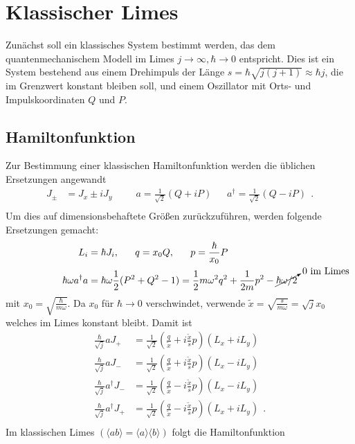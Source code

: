 \section{Klassischer Limes}
Zunächst soll ein klassisches System bestimmt werden, das dem quantenmechanischem Modell im Limes $j\rightarrow \infty, \hbar \rightarrow 0$ entspricht.
Dies ist ein System bestehend aus einem Drehimpuls der Länge $s = \hbar\sqrt{j(j+1)} \approx \hbar j$, die im Grenzwert konstant bleiben soll, und einem Oszillator mit Orts- und Impulskoordinaten $Q$ und $P$.
\subsection{Hamiltonfunktion}
Zur Bestimmung einer klassischen Hamiltonfunktion werden die üblichen Ersetzungen angewandt
\begin{align*}
  J_{\pm} &= J_x \pm i J_y~~~~~~~~~~~ a = \frac{1}{\sqrt{2}} (Q+iP)~~~~~~~ a^\dagger = \frac{1}{\sqrt{2}} (Q-iP)~~.\\
\end{align*}
Um dies auf dimensionsbehaftete Größen zurückzuführen, werden folgende Ersetzungen gemacht:
\begin{align*}
  L_i &= \hbar J_i,~~~~~  q=x_0 Q,~~~~~p= \frac{\hbar}{x_0} P\\
  \hbar \omega a^\dagger a &=\hbar \omega \frac{1}{2} (P^2+Q^2-1) = \frac{1}{2} m \omega^2 q^2 + \frac{1}{2m}p^2 -\cancelto{\text{0 im Limes}}{\hbar\omega/2}\\
\end{align*}
mit $x_0  =  \sqrt{\frac{\hbar}{m\omega}}$.
 Da $x_0$ für $\hbar\rightarrow 0$ verschwindet, verwende \linebreak  $\tilde{x} = \sqrt{\frac{s}{m\omega}} = \sqrt{j} x_0$ welches im Limes konstant bleibt.
Damit ist
\begin{align*}
  \frac{\hbar}{\sqrt{j}} a J_+ &= \frac{1}{\sqrt{2}}(\frac{q}{\tilde{x}} + i \frac{\tilde{x}}{s} p) (L_x + i L_y)\\
  \frac{\hbar}{\sqrt{j}} a J_- &=\frac{1}{\sqrt{2}}(\frac{q}{\tilde{x}} + i \frac{\tilde{x}}{s} p)(L_x - i L_y)\\
  \frac{\hbar}{\sqrt{j}} a^\dagger J_- &=\frac{1}{\sqrt{2}}(\frac{q}{\tilde{x}} - i \frac{\tilde{x}}{s} p)(L_x - i L_y)\\
  \frac{\hbar}{\sqrt{j}} a^\dagger J_+ &=\frac{1}{\sqrt{2}}(\frac{q}{\tilde{x}} - i \frac{\tilde{x}}{s} p)(L_x + i L_y)~~.\\
\end{align*}
Im klassischen Limes $(\langle ab\rangle = \langle a\rangle \langle b\rangle)$ folgt die Hamiltonfunktion
